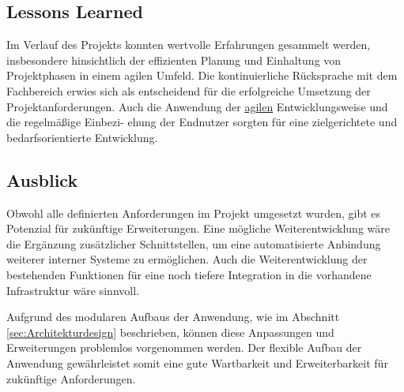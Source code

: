 \subsection{Lessons Learned}
\label{sec:LessonsLearned}

Im Verlauf des Projekts konnten wertvolle Erfahrungen gesammelt werden, insbesondere hinsichtlich der effizienten Planung und Einhaltung von Projektphasen in einem agilen Umfeld. Die kontinuierliche Rücksprache mit dem Fachbereich erwies sich als entscheidend für die erfolgreiche Umsetzung der Projektanforderungen. Auch die Anwendung der \hyperlink{agil}{\textcolor{AOBlau}{agilen}} Entwicklungsweise und die regelmäßige Einbezi-
ehung der Endnutzer sorgten für eine zielgerichtete und bedarfsorientierte Entwicklung.

\subsection{Ausblick}
\label{sec:Ausblick}

Obwohl alle definierten Anforderungen im Projekt umgesetzt wurden, gibt es Potenzial für zukünftige Erweiterungen. Eine mögliche Weiterentwicklung wäre die Ergänzung zusätzlicher Schnittstellen, um eine automatisierte Anbindung weiterer interner Systeme zu ermöglichen. Auch die Weiterentwicklung der bestehenden Funktionen für eine noch tiefere Integration in die vorhandene Infrastruktur wäre sinnvoll.

Aufgrund des modularen Aufbaus der Anwendung, wie im Abschnitt \ref{sec:Architekturdesign} beschrieben, können diese Anpassungen und Erweiterungen problemlos vorgenommen werden. Der flexible Aufbau der Anwendung gewährleistet somit eine gute Wartbarkeit und Erweiterbarkeit für zukünftige Anforderungen.
